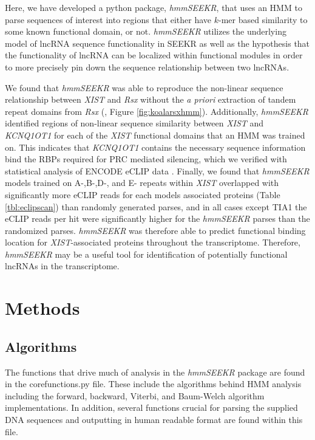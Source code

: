 Here, we have developed a python package, \emph{hmmSEEKR}, that uses an HMM to parse sequences of interest into regions that either have $k$-mer based similarity to some known functional domain, or not. \emph{hmmSEEKR} utilizes the underlying model of lncRNA sequence functionality in SEEKR \cite{Kirk2018FunctionalContent} as well as the hypothesis that the functionality of lncRNA can be localized within functional modules \cite{Pang2006RapidFunction, Nesterova2001CharacterizationSequence,Hezroni2015PrinciplesSpecies,Brockdorff2018LocalNcRNA,Sprague2019NonlinearDomains} in order to more precisely pin down the sequence relationship between two lncRNAs. 

We found that \emph{hmmSEEKR} was able to reproduce the non-linear sequence relationship between \emph{XIST} and \emph{Rsx} without the \emph{a priori} extraction of tandem repeat domains from \emph{Rsx} (\cite{Sprague2019NonlinearDomains}, Figure \ref{fig:koalarsxhmm}). Additionally, \emph{hmmSEEKR} identified regions of non-linear sequence similarity between \emph{XIST} and \emph{KCNQ1OT1} for each of the \emph{XIST} functional domains that an HMM was trained on. This indicates that \emph{KCNQ1OT1} contains the necessary sequence information bind the RBPs required for PRC mediated silencing, which we verified with statistical analysis of ENCODE eCLIP data \cite{VanNostrand2016RobusteCLIP}. Finally, we found that \emph{hmmSEEKR} models trained on A-,B-,D-, and E- repeats within \emph{XIST} overlapped with significantly more eCLIP reads for each models associated proteins (Table \ref{tbl:eclipscan}) than randomly generated parses, and in all cases except TIA1 the eCLIP reads per hit were significantly higher for the \emph{hmmSEEKR} parses than the randomized parses. \emph{hmmSEEKR} was therefore able to predict functional binding location for \emph{XIST}-associated proteins throughout the transcriptome. Therefore, \emph{hmmSEEKR} may be a useful tool for identification of potentially functional lncRNAs in the transcriptome. 




\section{Methods}
\subsection{Algorithms}
The functions that drive much of analysis in the \emph{hmmSEEKR} package are found in the corefunctions.py file. These include the algorithms behind HMM analysis including the forward, backward, Viterbi, and Baum-Welch algorithm implementations. In addition, several functions crucial for parsing the supplied DNA sequences and outputting in human readable format are found within this file.

